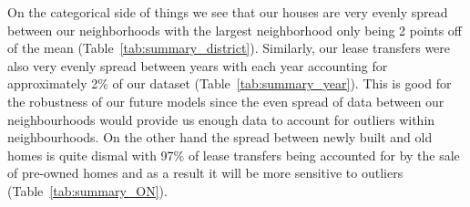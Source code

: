 On the categorical side of things we see that our houses are very evenly spread between our neighborhoods with the largest
 neighborhood only being 2 points off of the mean (Table~\ref{tab:summary_district}). Similarly, our lease transfers were also very evenly spread between years
  with each year accounting for approximately 2\% 
  of our dataset (Table~\ref{tab:summary_year}). This is good for the robustness of our future models since the even spread of data between 
  our neighbourhoods would provide us enough data to account for outliers within neighbourhoods. 
  On the other hand the spread between newly built and old homes is quite dismal with 97\%
   of lease transfers being accounted for by the sale of pre-owned homes and as a result it will be more sensitive to outliers (Table~\ref{tab:summary_ON}).
